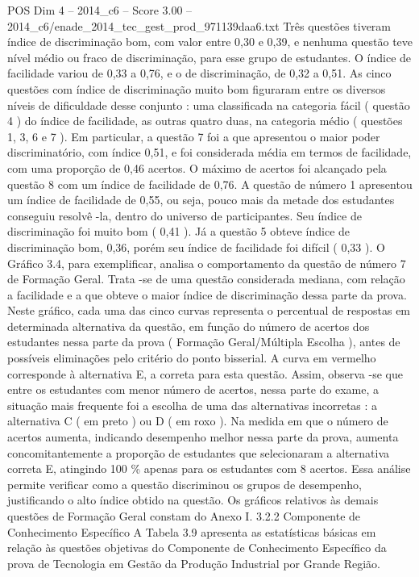 \begin{textsample}{POS Dim 4 – 2014\_c6 – Score 3.00 – 2014\_c6/enade\_2014\_tec\_gest\_prod\_971139daa6.txt}
Três questões tiveram índice de discriminação bom, com valor entre 0,30 e 0,39, e nenhuma questão teve nível médio ou fraco de discriminação, para esse grupo de estudantes.
O índice de facilidade variou de 0,33 a 0,76, e o de discriminação, de 0,32 a 0,51.
As cinco questões com índice de discriminação muito bom figuraram entre os diversos níveis de dificuldade desse conjunto : uma classificada na categoria fácil ( questão 4 ) do índice de facilidade, as outras quatro duas, na categoria médio ( questões 1, 3, 6 e 7 ).
Em particular, a questão 7 foi a que apresentou o maior poder discriminatório, com índice 0,51, e foi considerada média em termos de facilidade, com uma proporção de 0,46 acertos.
O máximo de acertos foi alcançado pela questão 8 com um índice de facilidade de 0,76.
A questão de número 1 apresentou um índice de facilidade de 0,55, ou seja, pouco mais da metade dos estudantes conseguiu resolvê -la, dentro do universo de participantes.
Seu índice de discriminação foi muito bom ( 0,41 ).
Já a questão 5 obteve índice de discriminação bom, 0,36, porém seu índice de facilidade foi difícil ( 0,33 ).
O Gráfico 3.4, para exemplificar, analisa o comportamento da questão de número 7 de Formação Geral.
Trata -se de uma questão considerada mediana, com relação a facilidade e a que obteve o maior índice de discriminação dessa parte da prova.
Neste gráfico, cada uma das cinco curvas representa o percentual de respostas em determinada alternativa da questão, em função do número de acertos dos estudantes nessa parte da prova ( Formação Geral/Múltipla Escolha ), antes de possíveis eliminações pelo critério do ponto bisserial.
A curva em vermelho corresponde à alternativa E, a correta para esta questão.
Assim, observa -se que entre os estudantes com menor número de acertos, nessa parte do exame, a situação mais frequente foi a escolha de uma das alternativas incorretas : a alternativa C ( em preto ) ou D ( em roxo ).
Na medida em que o número de acertos aumenta, indicando desempenho melhor nessa parte da prova, aumenta concomitantemente a proporção de estudantes que selecionaram a alternativa correta E, atingindo 100 \% apenas para os estudantes com 8 acertos.
Essa análise permite verificar como a questão discriminou os grupos de desempenho, justificando o alto índice obtido na questão.
Os gráficos relativos às demais questões de Formação Geral constam do Anexo I. 3.2.2 Componente de Conhecimento Específico A Tabela 3.9 apresenta as estatísticas básicas em relação às questões objetivas do Componente de Conhecimento Específico da prova de Tecnologia em Gestão da Produção Industrial por Grande Região.

\end{textsample}
